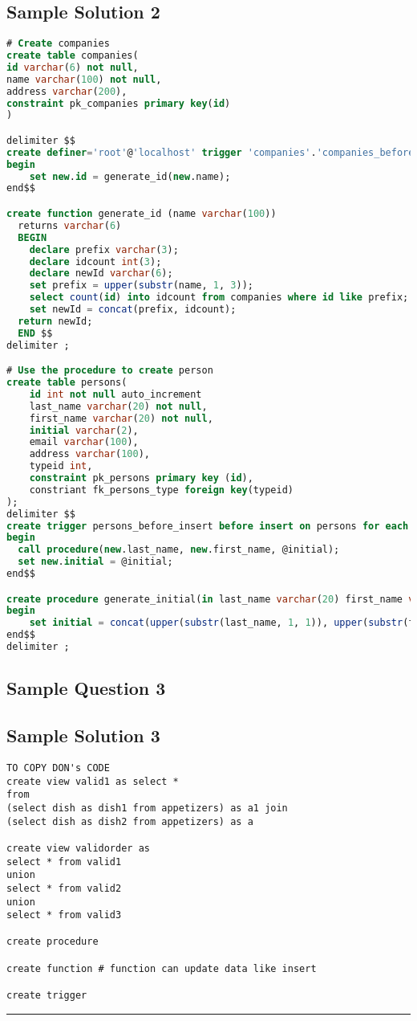 \subsection*{Sample Solution 2}
\begin{lstlisting}[language=SQL]
# Create companies
create table companies(
id varchar(6) not null,
name varchar(100) not null,
address varchar(200),
constraint pk_companies primary key(id)
)

delimiter $$
create definer='root'@'localhost' trigger 'companies'.'companies_before_insert' before insert on companies for each row
begin
	set new.id = generate_id(new.name);
end$$

create function generate_id (name varchar(100))
  returns varchar(6)
  BEGIN
    declare prefix varchar(3);
    declare idcount int(3);
    declare newId varchar(6);
    set prefix = upper(substr(name, 1, 3));
    select count(id) into idcount from companies where id like prefix;
    set newId = concat(prefix, idcount);
  return newId;
  END $$ 
delimiter ;

# Use the procedure to create person
create table persons(
	id int not null auto_increment
    last_name varchar(20) not null,
	first_name varchar(20) not null,
    initial varchar(2),
    email varchar(100),
    address varchar(100),
    typeid int,
    constraint pk_persons primary key (id),
    constriant fk_persons_type foreign key(typeid)
);
delimiter $$
create trigger persons_before_insert before insert on persons for each row
begin
  call procedure(new.last_name, new.first_name, @initial);
  set new.initial = @initial;
end$$

create procedure generate_initial(in last_name varchar(20) first_name varchar(20) ,out initial varchar(2))
begin
	set initial = concat(upper(substr(last_name, 1, 1)), upper(substr(first_name, 1, 1)))
end$$
delimiter ; 

\end{lstlisting}

\subsection*{Sample Question 3}

\subsection*{Sample Solution 3}
\begin{lstlisting}
TO COPY DON's CODE
create view valid1 as select *
from 
(select dish as dish1 from appetizers) as a1 join
(select dish as dish2 from appetizers) as a

create view validorder as
select * from valid1
union
select * from valid2
union 
select * from valid3

create procedure

create function # function can update data like insert

create trigger
\end{lstlisting}


\rule{0.3\linewidth}{0.25pt}
\scriptsize


